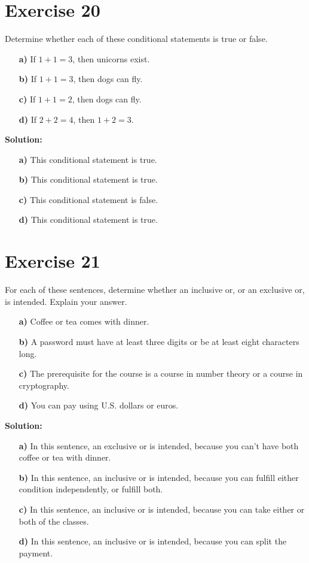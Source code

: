 \documentclass{Axon}
\begin{document}
\section*{Exercise 20}
Determine whether each of these conditional statements is true or false.
\begin{enumerate}
    \item[\textbf{a)}] If \(1 + 1 = 3\), then unicorns exist.
    \item[\textbf{b)}] If \(1 + 1 = 3\), then dogs can fly.
    \item[\textbf{c)}] If \(1 + 1 = 2\), then dogs can fly.
    \item[\textbf{d)}] If \(2 + 2 = 4\), then \(1 + 2 = 3\).
\end{enumerate}

\noindent
\textbf{Solution:}
\begin{enumerate}
    \item[\textbf{a)}] This conditional statement is true.
    \item[\textbf{b)}] This conditional statement is true.
    \item[\textbf{c)}] This conditional statement is false.
    \item[\textbf{d)}] This conditional statement is true.
\end{enumerate}

\section*{Exercise 21}
For each of these sentences, determine whether an inclusive or, or an exclusive or, is intended. Explain your answer.
\begin{enumerate}
    \item[\textbf{a)}] Coffee or tea comes with dinner.
    \item[\textbf{b)}] A password must have at least three digits or be at least eight characters long.
    \item[\textbf{c)}] The prerequisite for the course is a course in number theory or a course in cryptography.
    \item[\textbf{d)}] You can pay using U.S. dollars or euros.
\end{enumerate}

\noindent
\textbf{Solution:}
\begin{enumerate}
    \item[\textbf{a)}] In this sentence, an exclusive or is intended, because you can't have both coffee or tea with dinner.
    \item[\textbf{b)}] In this sentence, an inclusive or is intended, because you can fulfill either condition independently, or fulfill both.
    \item[\textbf{c)}] In this sentence, an inclusive or is intended, because you can take either or both of the classes.
    \item[\textbf{d)}] In this sentence, an inclusive or is intended, because you can split the payment.
\end{enumerate}
\end{document}
